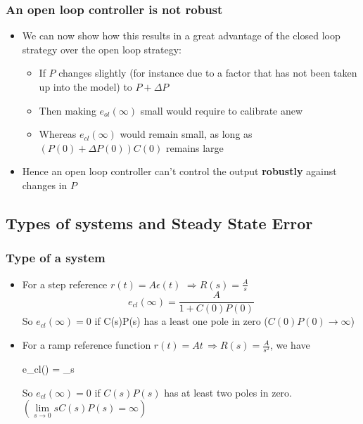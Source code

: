\begin{frame}
	\frametitle{An open loop controller is not robust}
	\begin{itemize}
		\item We can now show how this results in a great advantage of the closed loop strategy over the open loop strategy:
		\begin{itemize}
			\item If $P$ changes slightly (for instance due to a factor that has not been taken up into the model) to $P+\Delta P$
			\item Then making $e_{ol}(\infty)$ small would require to calibrate anew
			\item Whereas $e_{cl} (\infty)$ would remain small, as long as $(P(0)+\Delta P(0))C(0)$ remains large
			
		\end{itemize}
		\item Hence an open loop controller can't control the output \textbf{robustly} against changes in $P$
	\end{itemize}
\end{frame}

\subsection[Types of systems and SS-error]{Types of systems and Steady State Error}

\begin{frame}
	\frametitle{Type of a system}
	\begin{itemize}
		\item For a step reference $r(t) = A \epsilon (t)$ $\Rightarrow R(s) = \frac{A}{s}$
		\[e_{cl}(\infty) = \frac{A}{1+C(0)P(0)} \]
		So $e_{cl}(\infty) = 0$ if C(s)P(s) has a least one pole in zero ($C(0)P(0) \rightarrow \infty$)
		\item For a ramp reference function $r(t) = At \, \Rightarrow R(s) = \frac{A}{s^2}$, we have
		\begin{flalign*}
			e_{cl}(\infty) = \lim\limits_{s }  
		\end{flalign*}
		So $e_{cl}(\infty) = 0$ if $C(s)P(s)$ has at least two poles in zero. $\left(\lim\limits_{s\rightarrow 0} sC(s)P(s) = \infty\right)$
	\end{itemize}
\end{frame}

